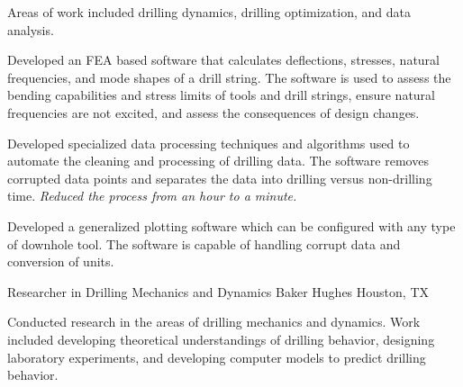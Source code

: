 \documentclass{leresume}
\begin{document}
					\noindent Areas of work included drilling dynamics, drilling optimization, and data analysis.
		\begin{bulletedlist}
			
		\item 
					Developed an FEA based software that calculates deflections, stresses, natural frequencies, and mode shapes of a drill string.  The software is used to assess the bending capabilities and stress limits of tools and drill strings, ensure natural frequencies are not excited, and assess the consequences of design changes.
					
		\item 
					Developed specialized data processing techniques and algorithms used to automate the cleaning and processing of drilling data.  The software removes corrupted data points and separates the data into drilling versus non-drilling time.  
		\textit{Reduced the process from an hour to a minute.}
	
		\item 
					Developed a generalized plotting software which can be configured with any type of downhole tool.  The software is capable of handling corrupt data and conversion of units.
				
		\end{bulletedlist}
	
            {Researcher in Drilling Mechanics and Dynamics}
            {Baker Hughes}
			{Houston, TX}
			
					\noindent 
				Conducted research in the areas of drilling mechanics and dynamics.  Work included developing theoretical understandings of drilling behavior, designing laboratory experiments, and developing computer models to predict drilling behavior.
			
\end{document}
